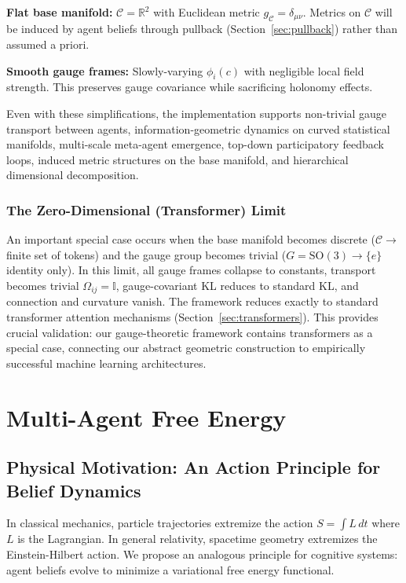 \documentclass[11pt]{article}
\begin{document}
\textbf{Flat base manifold:} $\mathcal{C} = \mathbb{R}^2$ with Euclidean metric $g_{\mathcal{C}} = \delta_{\mu\nu}$. Metrics on $\mathcal{C}$ will be induced by agent beliefs through pullback (Section~\ref{sec:pullback}) rather than assumed a priori.

\textbf{Smooth gauge frames:} Slowly-varying $\phi_i(c)$ with negligible local field strength. This preserves gauge covariance while sacrificing holonomy effects.

Even with these simplifications, the implementation supports non-trivial gauge transport between agents, information-geometric dynamics on curved statistical manifolds, multi-scale meta-agent emergence, top-down participatory feedback loops, induced metric structures on the base manifold, and hierarchical dimensional decomposition.

\subsubsection{The Zero-Dimensional (Transformer) Limit}

An important special case occurs when the base manifold becomes discrete ($\mathcal{C} \to$ finite set of tokens) and the gauge group becomes trivial ($G = \mathrm{SO}(3) \to \{e\}$ identity only). In this limit, all gauge frames collapse to constants, transport becomes trivial $\Omega_{ij} = \mathbb{I}$, gauge-covariant KL reduces to standard KL, and connection and curvature vanish. The framework reduces exactly to standard transformer attention mechanisms (Section~\ref{sec:transformers}). This provides crucial validation: our gauge-theoretic framework contains transformers as a special case, connecting our abstract geometric construction to empirically successful machine learning architectures.

\section{Multi-Agent Free Energy}
\label{sec:free_energy}

\subsection{Physical Motivation: An Action Principle for Belief Dynamics}

In classical mechanics, particle trajectories extremize the action $S = \int L \, dt$ where $L$ is the Lagrangian. In general relativity, spacetime geometry extremizes the Einstein-Hilbert action. We propose an analogous principle for cognitive systems: agent beliefs evolve to minimize a variational free energy functional.
\end{document}
